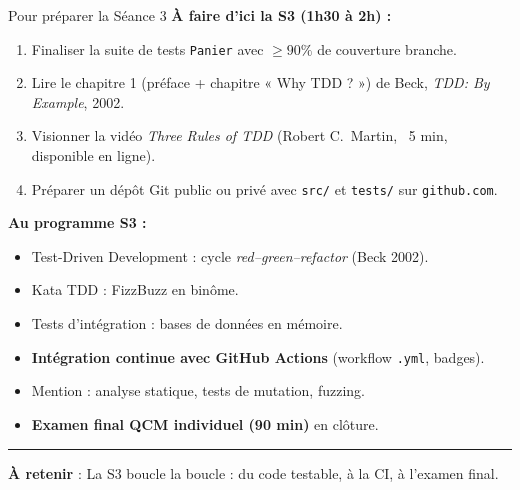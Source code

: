 \documentclass[aspectratio=169,11pt]{beamer}
\newcommand{\takeaway}[1]{%
\vfill\begin{beamercolorbox}[wd=\linewidth,sep=0.4em]{}
\color{accent2}\rule[0.6ex]{1.2em}{1.2pt}\hspace{0.4em}%
\textbf{\color{accent2}\small À retenir} \textcolor{textsoft}{:} %
{\small\color{textmain}#1}
\end{beamercolorbox}}
\begin{document}
\begin{frame}[t,shrink=12]{Pour préparer la Séance 3}
\footnotesize
\textbf{À faire d'ici la S3 (1h30 à 2h) :}\\[0.3em]
\begin{enumerate}\itemsep0.18em
\item Finaliser la suite de tests \texttt{Panier} avec $\geq 90\%$ de couverture branche.
\item Lire le chapitre 1 (préface + chapitre « Why TDD ? ») de Beck, \emph{TDD: By Example}, 2002.
\item Visionner la vidéo \emph{Three Rules of TDD} (Robert C.\ Martin, ~5 min, disponible en ligne).
\item Préparer un dépôt Git public ou privé avec \texttt{src/} et \texttt{tests/} sur \texttt{github.com}.
\end{enumerate}
\vspace{0.4cm}
\textbf{Au programme S3 :}
\begin{itemize}\itemsep0.08em
\item Test-Driven Development : cycle \emph{red--green--refactor} (Beck 2002).
\item Kata TDD : FizzBuzz en binôme.
\item Tests d'intégration : bases de données en mémoire.
\item \textbf{Intégration continue avec GitHub Actions} (workflow \texttt{.yml}, badges).
\item Mention : analyse statique, tests de mutation, fuzzing.
\item \textbf{Examen final QCM individuel (90 min)} en clôture.
\end{itemize}
\takeaway{La S3 boucle la boucle : du code testable, à la CI, à l'examen final.}
\end{frame}
\end{document}
